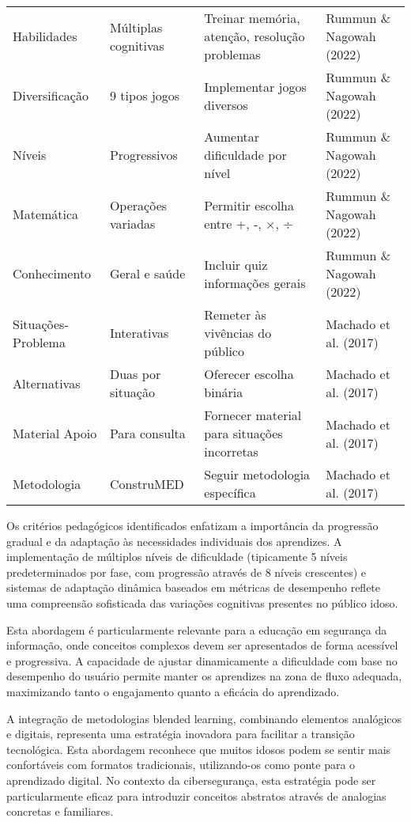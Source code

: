 \begin{table}[H]
\begin{table}[H]
\begin{tabular}{p{2.5cm}p{3.5cm}p{4.5cm}p{2.5cm}}
Habilidades & Múltiplas cognitivas & Treinar memória, atenção, resolução problemas & Rummun \& Nagowah (2022) \\
Diversificação & 9 tipos jogos & Implementar jogos diversos & Rummun \& Nagowah (2022) \\
Níveis & Progressivos & Aumentar dificuldade por nível & Rummun \& Nagowah (2022) \\
Matemática & Operações variadas & Permitir escolha entre +, -, ×, ÷ & Rummun \& Nagowah (2022) \\
Conhecimento & Geral e saúde & Incluir quiz informações gerais & Rummun \& Nagowah (2022) \\
Situações-Problema & Interativas & Remeter às vivências do público & Machado et al. (2017) \\
Alternativas & Duas por situação & Oferecer escolha binária & Machado et al. (2017) \\
Material Apoio & Para consulta & Fornecer material para situações incorretas & Machado et al. (2017) \\
Metodologia & ConstruMED & Seguir metodologia específica & Machado et al. (2017) \\
\hline
\end{tabular}
\end{table}

Os critérios pedagógicos identificados enfatizam a importância da progressão gradual e da adaptação às necessidades individuais dos aprendizes. A implementação de múltiplos níveis de dificuldade (tipicamente 5 níveis predeterminados por fase, com progressão através de 8 níveis crescentes) e sistemas de adaptação dinâmica baseados em métricas de desempenho reflete uma compreensão sofisticada das variações cognitivas presentes no público idoso.

Esta abordagem é particularmente relevante para a educação em segurança da informação, onde conceitos complexos devem ser apresentados de forma acessível e progressiva. A capacidade de ajustar dinamicamente a dificuldade com base no desempenho do usuário permite manter os aprendizes na zona de fluxo adequada, maximizando tanto o engajamento quanto a eficácia do aprendizado.

A integração de metodologias blended learning, combinando elementos analógicos e digitais, representa uma estratégia inovadora para facilitar a transição tecnológica. Esta abordagem reconhece que muitos idosos podem se sentir mais confortáveis com formatos tradicionais, utilizando-os como ponte para o aprendizado digital. No contexto da cibersegurança, esta estratégia pode ser particularmente eficaz para introduzir conceitos abstratos através de analogias concretas e familiares.


\end{table}
